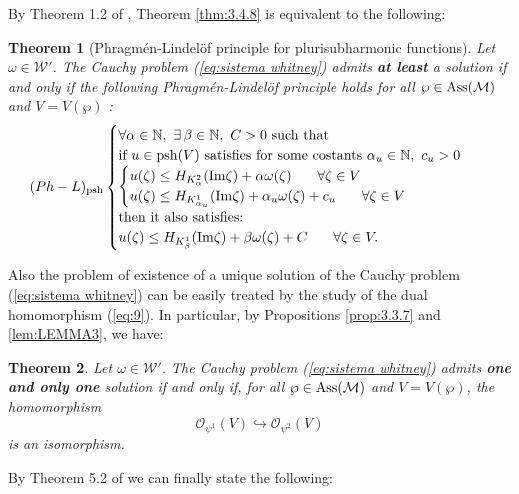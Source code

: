 \documentclass[twoside]{amsart}
\newtheorem{Th}{Theorem}[section]
\begin{document}
By Theorem 1.2 of \cite{BN2}, Theorem \ref{thm:3.4.8} is equivalent
to the following:

\begin{Th}[Phragm\'en-Lindel\"of principle for
    plurisubharmonic functions]
  Let $\omega\in{\mathcal{W}}'$.
The Cauchy problem (\ref{eq:sistema whitney}) admits \textbf{at least}
a solution if and only if the following Phragm\'en-Lindel\"{o}f principle
holds for all $\wp\in{\mathop{\rm Ass}\nolimits}({\mathcal{M}})$ and $V=V(\wp)$ :
\begin{align*}
(Ph-L)_{\mathop{\rm psh}\nolimits} & 
\begin{cases}
\forall\alpha\in{\mathbb N},\,\,\exists\,\beta\in{\mathbb N},\,\,C>0\,\,\mbox{such that} 
& \mbox{}\\
\mbox{if }u\in{\mathop{\rm psh}\nolimits}(V)\,\,\mbox{satisfies for some costants }\alpha_{u}\in{\mathbb N},
\,\,c_{u}>0\\
\begin{cases}
u(\zeta)\leq H_{K_{\alpha}^{2}}({\mathop{\rm Im}\nolimits}\zeta)+\alpha\omega(\zeta)
\,\,\,\,\,\,\,\,\,\,\,\forall\zeta\in V\\
u(\zeta)\leq H_{K_{\alpha_{u}}^{1}}({\mathop{\rm Im}\nolimits}\zeta)+\alpha_{u}\omega(\zeta)+c_{u}
\,\,\,\,\,\,\,\,\,\,\,\forall\zeta\in V
\end{cases}\\
\mbox{then it also satisfies:}\\
u(\zeta)\leq H_{K_{\beta}^{1}}({\mathop{\rm Im}\nolimits}\zeta)+\beta\omega(\zeta)+C
\,\,\,\,\,\,\,\,\,\,\,\forall\zeta\in V.
\end{cases}
\end{align*}
\end{Th}

Also the problem of existence of a unique
solution of the Cauchy problem (\ref{eq:sistema whitney}) can be
easily treated by the study of the dual homomorphism (\ref{eq:9}).
In particular, by Propositions \ref{prop:3.3.7} and
\ref{lem:LEMMA3},
we have:

\begin{Th}
  Let $\omega\in{\mathcal{W}}'$.
The Cauchy problem (\ref{eq:sistema whitney}) admits \textbf{one
and only one} solution if and only if, for all $\wp\in{\mathop{\rm Ass}\nolimits}({\mathcal{M}})$
and $V=V(\wp)$, the homomorphism
\[
{\mathcal O}_{\psi^{1}}(V)\hookrightarrow{\mathcal O}_{\psi^{2}}(V)
\]
is an isomorphism.
\end{Th}

By Theorem 5.2 of \cite{BN3} we can finally state the following:
\end{document}
